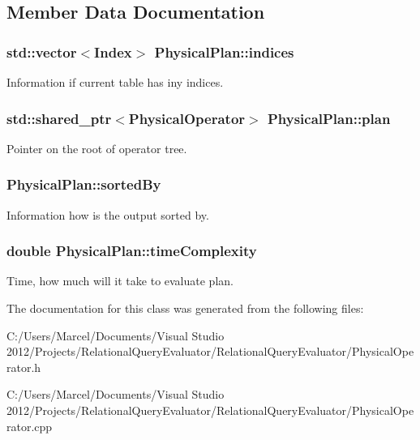 \subsection{Member Data Documentation}
\hypertarget{class_physical_plan_a4d8ba56ef7d228a2a11176da541af5ef}{
\subsubsection[{indices}]{\setlength{\rightskip}{0pt plus 5cm}std\+::vector$<${\bf Index}$>$ Physical\+Plan\+::indices}}\label{class_physical_plan_a4d8ba56ef7d228a2a11176da541af5ef}
Information if current table has iny indices. \hypertarget{class_physical_plan_a97349262f468410057d66f00334003a5}{
\subsubsection[{plan}]{\setlength{\rightskip}{0pt plus 5cm}std\+::shared\+\_\+ptr$<${\bf Physical\+Operator}$>$ Physical\+Plan\+::plan}}\label{class_physical_plan_a97349262f468410057d66f00334003a5}
Pointer on the root of operator tree. \hypertarget{class_physical_plan_a6a49fcbbcb8e22d1f573106de5847c45}{
\subsubsection[{sorted\+By}]{ Physical\+Plan\+::sorted\+By}}\label{class_physical_plan_a6a49fcbbcb8e22d1f573106de5847c45}
Information how is the output sorted by. \hypertarget{class_physical_plan_a2176d32a64b58406206181395c4127bc}{
\subsubsection[{time\+Complexity}]{\setlength{\rightskip}{0pt plus 5cm}double Physical\+Plan\+::time\+Complexity}}\label{class_physical_plan_a2176d32a64b58406206181395c4127bc}
Time, how much will it take to evaluate plan. 

The documentation for this class was generated from the following files\+:\begin{DoxyCompactItemize}
\item 
C\+:/\+Users/\+Marcel/\+Documents/\+Visual Studio 2012/\+Projects/\+Relational\+Query\+Evaluator/\+Relational\+Query\+Evaluator/Physical\+Operator.\+h\item 
C\+:/\+Users/\+Marcel/\+Documents/\+Visual Studio 2012/\+Projects/\+Relational\+Query\+Evaluator/\+Relational\+Query\+Evaluator/Physical\+Operator.\+cpp\end{DoxyCompactItemize}
